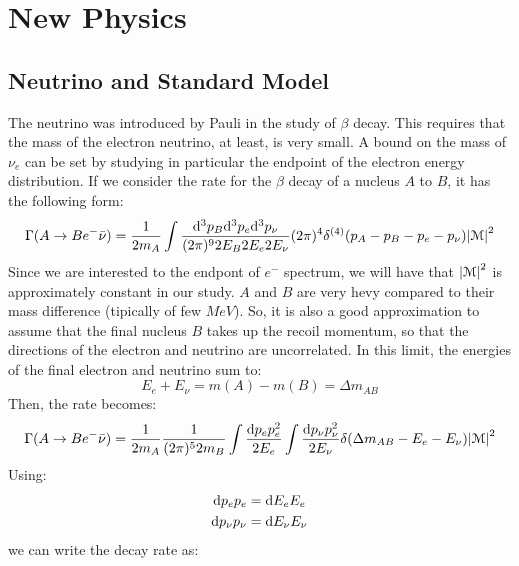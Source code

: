 \documentclass[../../main/main.tex]{subfiles}
\begin{document}
\chapter{New Physics}


\section{Neutrino and Standard Model}
The neutrino was introduced by Pauli in the study of \( \beta \) decay. This requires that the mass of the electron neutrino, at
least, is very small. A bound on the mass of \( \nu_e \) can be set by studying in particular the endpoint of the electron energy distribution. If we consider the rate for the \( \beta \) decay of a nucleus \( A \) to \( B \), it has the following form:
\begin{equation}
	\Gamma(A \rightarrow Be^-\bar{\nu})
	=
	\frac{1}{2m_A}
	\int \frac{\mathrm{d}{^3p_B} \mathrm{d}{^3p_e} \mathrm{d}{^3 p_{\nu}}}{(2\pi)^9 2E_B 2E_e 2E_{\nu}}
	(2\pi)^4 \delta^{(4)}(p_A - p_B - p_e - p_{\nu})
	\abs{\mathcal{M}}^2
	\label{eq:}
\end{equation}
Since we are interested to the endpont of \( e^- \) spectrum, we will have that \( \abs{\mathcal{M}}^2 \) is approximately constant in our study. \( A \) and \( B \) are very hevy compared to their mass difference (tipically of few \( \si{MeV} \)). So, it is also a good approximation to assume that the final nucleus \( B \) takes up the recoil momentum, so that the directions of the electron and neutrino are uncorrelated. In this limit, the energies of the final electron and neutrino sum to:
\begin{equation}
	E_e + E_{\nu}
	=
	m(A) - m(B)
	=
	\Delta m_{AB}
	\label{eq:}
\end{equation}
Then, the rate becomes:
\begin{equation}
	\Gamma(A \rightarrow Be^-\bar{\nu})
	=
	\frac{1}{2m_A} \frac{1}{(2\pi)^5 2m_B}
	\int \frac{\mathrm{d}{p_e} p_e^2}{2E_e}
	\int \frac{\mathrm{d}{p_{\nu}} p_{\nu}^2}{2E_{\nu}}
	\delta(\Delta m_{AB} - E_e - E_{\nu})
	\abs{\mathcal{M}}^2
	\label{eq:}
\end{equation}
Using:
\begin{align*}
	\mathrm{d}{p_e}p_e &= \mathrm{d}{E_e} E_e	\\
	\mathrm{d}{p_{\nu}}p_{\nu} &= \mathrm{d}{E_{\nu}} E_{\nu}
\end{align*}
we can write the decay rate as:
\end{document}
